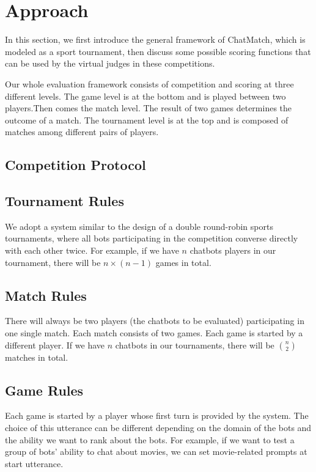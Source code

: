 \section{Approach}
\label{sec:approach}
In this section, we first introduce the general framework of ChatMatch, which is modeled as
a sport tournament, then discuss some possible scoring functions that can be used by
the virtual judges in these competitions.

Our whole evaluation framework consists of competition and scoring at three different levels. The game level is at the bottom and is played between two players.Then comes the match level. The result of two games determines the outcome of a match. The tournament level is at the top and is composed of matches among different pairs of players. 

\subsection{Competition Protocol}
\label{ssec:competition}

\subsection*{Tournament Rules}
We adopt a system similar to the design of a double round-robin 
sports tournaments, where all bots participating in the competition 
converse directly with each other twice. For example, 
if we have $n$ chatbots players in our tournament, 
there will be $n\times ( n-1) $ games in total.

\subsection*{Match Rules}
There will always be two players (the chatbots to be evaluated) 
participating in one single match. Each match consists of two games.
Each game is started by a different player. 
If we have $n$ chatbots in our tournaments, there 
will be ${n \choose 2}$ matches in total. 

\subsection*{Game Rules}
Each game is started by a player whose first turn is provided by 
the system. The choice of this utterance can be different 
depending on the domain of the bots and the ability we want to 
rank about the bots. For example, if we want to test a group of 
bots' ability to chat about movies, we can set movie-related prompts at 
start utterance. 

